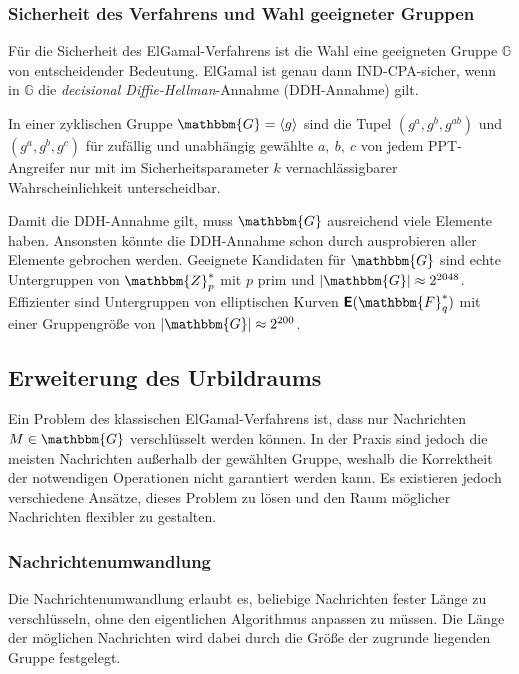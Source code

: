 \subsubsection{Sicherheit des Verfahrens und Wahl geeigneter Gruppen}
Für die Sicherheit des ElGamal-Verfahrens ist die Wahl eine geeigneten
Gruppe $\mathbb{G}$ von entscheidender Bedeutung. ElGamal ist genau dann
IND-CPA-sicher, wenn in $\mathbb{G}$ die \emph{decisional
  Diffie-Hellman}-Annahme \indexDecisionalDiffieHellman (DDH-Annahme)
gilt.
\begin{definition}\label{def:ddh} In einer zyklischen
  Gruppe $\mathbbm{G} = \langle g \rangle$ sind die Tupel $(g^a, g^b,
  g^{ab})$ und $(g^a, g^b, g^c)$ für zufällig und unabhängig gewählte
  $a,~b,~c$ von jedem PPT-Angreifer nur mit im Sicherheitsparameter $k$
  vernachlässigbarer Wahrscheinlichkeit unterscheidbar.
\end{definition}

Damit die DDH-Annahme gilt, muss $\mathbbm{G}$ ausreichend viele
Elemente haben. Ansonsten könnte die DDH-Annahme schon durch
ausprobieren aller Elemente gebrochen werden. Geeignete Kandidaten für
$\mathbbm{G}$ sind echte Untergruppen von $\mathbbm{Z}^*_p$ mit $p$ prim
und $|\mathbbm{G}| \approx 2^{2048}$. Effizienter sind Untergruppen von
elliptischen Kurven $\boldsymbol{\mathsf{E}}(\mathbbm{F}^*_q)$ mit einer
Gruppengröße von $|\mathbbm{G}| \approx 2^{200}$.

\subsection{Erweiterung des Urbildraums} Ein Problem des klassischen
ElGamal-Verfahrens ist, dass nur Nachrichten $M \in \mathbbm{G}$
verschlüsselt werden können. In der Praxis sind jedoch die meisten
Nachrichten außerhalb der gewählten Gruppe, weshalb die Korrektheit der
notwendigen Operationen nicht garantiert werden kann. Es existieren
jedoch verschiedene Ansätze, dieses Problem zu lösen und den Raum
möglicher Nachrichten flexibler zu gestalten.

\subsubsection{Nachrichtenumwandlung} Die Nachrichtenumwandlung
\indexMessageTransformation erlaubt es, beliebige Nachrichten fester
Länge zu verschlüsseln, ohne den eigentlichen Algorithmus anpassen zu
müssen. Die Länge der möglichen Nachrichten wird dabei durch die Größe
der zugrunde liegenden Gruppe festgelegt.

